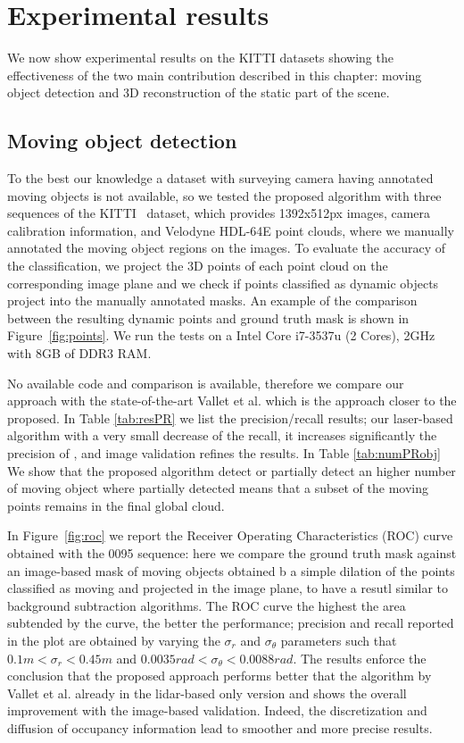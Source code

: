 \section{Experimental results}%
\label{sec:experiments}
We now show experimental results on the KITTI datasets showing the effectiveness of the two main contribution described in this chapter: moving object detection and 3D reconstruction of the static part of the scene.
\subsection{Moving object detection}
To the best our knowledge a dataset with surveying camera having annotated moving objects is not available, so we tested the proposed algorithm with three sequences of the KITTI~\cite{Kitti} dataset, which provides 1392x512px images, camera calibration information, and Velodyne HDL-64E point clouds, where we manually annotated the moving object regions on the images. To evaluate the accuracy of the classification, we project the 3D points of each point cloud on the corresponding image plane and we check if points classified as dynamic objects project into the manually annotated masks. An example of the comparison between the resulting dynamic points and ground truth mask is shown in Figure~\ref{fig:points}.
We run the tests on a  Intel Core i7-3537u (2 Cores), 2GHz with 8GB of DDR3 RAM. 

No available code and comparison is available, therefore we compare our approach with the state-of-the-art Vallet et al. \cite{vallet2015extracting} which is the approach closer to the proposed.
In Table \ref{tab:resPR} we list the precision/recall results; our laser-based algorithm with a very small decrease of the recall, it increases significantly the precision of \cite{vallet2015extracting}, and image validation refines the results.
In Table \ref{tab:numPRobj} We show that the proposed algorithm detect or partially detect an higher number of moving object where  partially detected means that a subset of the moving points remains in the final global cloud.

In Figure~\ref{fig:roc} we report the Receiver Operating Characteristics (ROC) curve obtained with the 0095 sequence: here we compare the ground truth mask against an image-based mask of moving objects obtained b a simple dilation of the points classified as moving and projected in the image plane, to have a resutl similar to background subtraction algorithms. 
The ROC curve the highest the area subtended by the curve, the better the performance; precision and recall reported in the plot are obtained by varying the $\sigma_r$ and $\sigma_{\theta}$ parameters such that $0.1m<\sigma_r<0.45m$ and $0.0035rad<\sigma_{\theta}<0.0088rad$.
The results enforce the conclusion that the proposed approach performs better that the algorithm by Vallet et al. already in the lidar-based only version and shows the overall improvement with the image-based validation. Indeed, the discretization and diffusion of occupancy information lead to smoother and more precise results.

